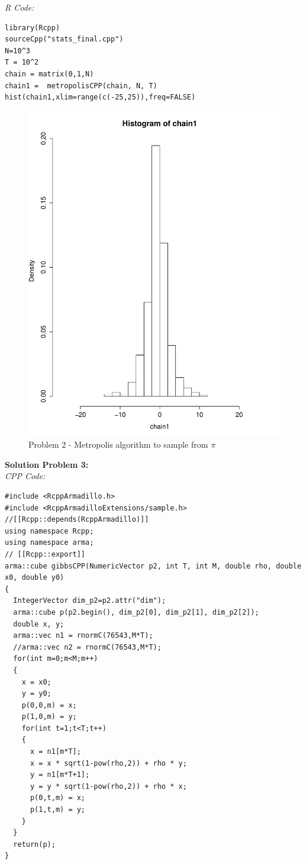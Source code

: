 \documentclass[paper=a4, fontsize=11pt]{scrartcl} %
\numberwithin{equation}{section} %
\numberwithin{figure}{section} %
\numberwithin{table}{section} %
\begin{document}
\textit{R Code:}

\begin{lstlisting}
library(Rcpp)
sourceCpp("stats_final.cpp")
N=10^3
T = 10^2
chain = matrix(0,1,N)
chain1 =  metropolisCPP(chain, N, T)
hist(chain1,xlim=range(c(-25,25)),freq=FALSE)
\end{lstlisting}

\begin{figure}[h!]
	\centering
	\includegraphics[scale = 0.5]{2.pdf}
	\caption{Problem 2 - Metropolis algorithm to sample from $\pi$} 
\end{figure}

\newpage
\textbf{Solution Problem 3:} \\
\textit{CPP Code:}

\begin{lstlisting}
#include <RcppArmadillo.h>
#include <RcppArmadilloExtensions/sample.h>
//[[Rcpp::depends(RcppArmadillo)]]
using namespace Rcpp;
using namespace arma;
// [[Rcpp::export]]
arma::cube gibbsCPP(NumericVector p2, int T, int M, double rho, double x0, double y0) 
{
  IntegerVector dim_p2=p2.attr("dim");
  arma::cube p(p2.begin(), dim_p2[0], dim_p2[1], dim_p2[2]);
  double x, y;
  arma::vec n1 = rnormC(76543,M*T);
  //arma::vec n2 = rnormC(76543,M*T);
  for(int m=0;m<M;m++)
  {
    x = x0;
    y = y0;
    p(0,0,m) = x;
    p(1,0,m) = y;
    for(int t=1;t<T;t++)
    {
      x = n1[m*T];
      x = x * sqrt(1-pow(rho,2)) + rho * y;
      y = n1[m*T+1];
      y = y * sqrt(1-pow(rho,2)) + rho * x;
      p(0,t,m) = x;
      p(1,t,m) = y; 
    }
  }
  return(p);
}
\end{lstlisting}
\end{document}
